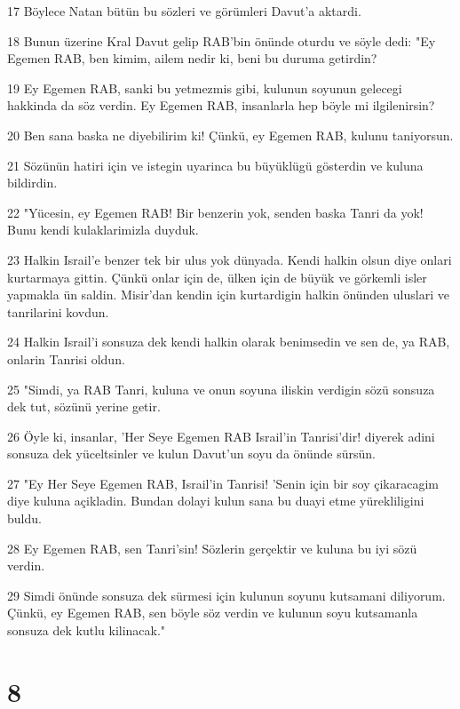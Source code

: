 \par 17 Böylece Natan bütün bu sözleri ve görümleri Davut'a aktardi.
\par 18 Bunun üzerine Kral Davut gelip RAB'bin önünde oturdu ve söyle dedi: "Ey Egemen RAB, ben kimim, ailem nedir ki, beni bu duruma getirdin?
\par 19 Ey Egemen RAB, sanki bu yetmezmis gibi, kulunun soyunun gelecegi hakkinda da söz verdin. Ey Egemen RAB, insanlarla hep böyle mi ilgilenirsin?
\par 20 Ben sana baska ne diyebilirim ki! Çünkü, ey Egemen RAB, kulunu taniyorsun.
\par 21 Sözünün hatiri için ve istegin uyarinca bu büyüklügü gösterdin ve kuluna bildirdin.
\par 22 "Yücesin, ey Egemen RAB! Bir benzerin yok, senden baska Tanri da yok! Bunu kendi kulaklarimizla duyduk.
\par 23 Halkin Israil'e benzer tek bir ulus yok dünyada. Kendi halkin olsun diye onlari kurtarmaya gittin. Çünkü onlar için de, ülken için de büyük ve görkemli isler yapmakla ün saldin. Misir'dan kendin için kurtardigin halkin önünden uluslari ve tanrilarini kovdun.
\par 24 Halkin Israil'i sonsuza dek kendi halkin olarak benimsedin ve sen de, ya RAB, onlarin Tanrisi oldun.
\par 25 "Simdi, ya RAB Tanri, kuluna ve onun soyuna iliskin verdigin sözü sonsuza dek tut, sözünü yerine getir.
\par 26 Öyle ki, insanlar, 'Her Seye Egemen RAB Israil'in Tanrisi'dir! diyerek adini sonsuza dek yüceltsinler ve kulun Davut'un soyu da önünde sürsün.
\par 27 "Ey Her Seye Egemen RAB, Israil'in Tanrisi! 'Senin için bir soy çikaracagim diye kuluna açikladin. Bundan dolayi kulun sana bu duayi etme yürekliligini buldu.
\par 28 Ey Egemen RAB, sen Tanri'sin! Sözlerin gerçektir ve kuluna bu iyi sözü verdin.
\par 29 Simdi önünde sonsuza dek sürmesi için kulunun soyunu kutsamani diliyorum. Çünkü, ey Egemen RAB, sen böyle söz verdin ve kulunun soyu kutsamanla sonsuza dek kutlu kilinacak."

\chapter{8}

